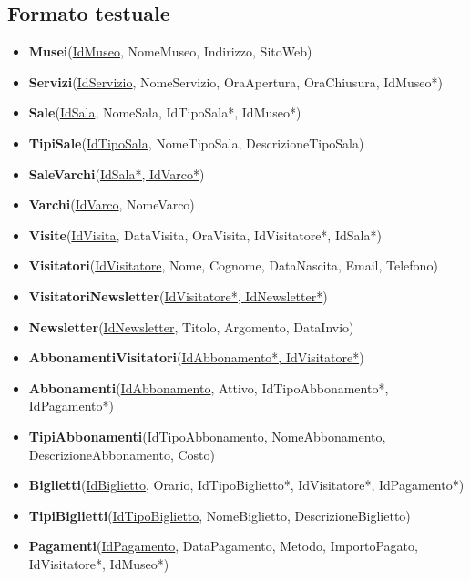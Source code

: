 \documentclass[a4paper, 12pt]{article}
\begin{document}
\subsection{Formato testuale}
\begin{itemize}
    \item \textbf{Musei}(\underline{IdMuseo}, NomeMuseo, Indirizzo, SitoWeb)
    \item \textbf{Servizi}(\underline{IdServizio}, NomeServizio, OraApertura, OraChiusura, IdMuseo*)
    \item \textbf{Sale}(\underline{IdSala}, NomeSala, IdTipoSala*, IdMuseo*)
    \item \textbf{TipiSale}(\underline{IdTipoSala}, NomeTipoSala, DescrizioneTipoSala)
    \item \textbf{SaleVarchi}(\underline{IdSala*, IdVarco*})
    \item \textbf{Varchi}(\underline{IdVarco}, NomeVarco)
    \item \textbf{Visite}(\underline{IdVisita}, DataVisita, OraVisita, IdVisitatore*, IdSala*)
    \item \textbf{Visitatori}(\underline{IdVisitatore}, Nome, Cognome, DataNascita, Email, Telefono)
    \item \textbf{VisitatoriNewsletter}(\underline{IdVisitatore*, IdNewsletter*})
    \item \textbf{Newsletter}(\underline{IdNewsletter}, Titolo, Argomento, DataInvio)
    \item \textbf{AbbonamentiVisitatori}(\underline{IdAbbonamento*, IdVisitatore*})
    \item \textbf{Abbonamenti}(\underline{IdAbbonamento}, Attivo, IdTipoAbbonamento*, IdPagamento*)
    \item \textbf{TipiAbbonamenti}(\underline{IdTipoAbbonamento}, NomeAbbonamento, DescrizioneAbbonamento, Costo)
    \item \textbf{Biglietti}(\underline{IdBiglietto}, Orario, IdTipoBiglietto*, IdVisitatore*, IdPagamento*)
    \item \textbf{TipiBiglietti}(\underline{IdTipoBiglietto}, NomeBiglietto, DescrizioneBiglietto)
    \item \textbf{Pagamenti}(\underline{IdPagamento}, DataPagamento, Metodo, ImportoPagato, IdVisitatore*, IdMuseo*)
\end{itemize}
\end{document}
